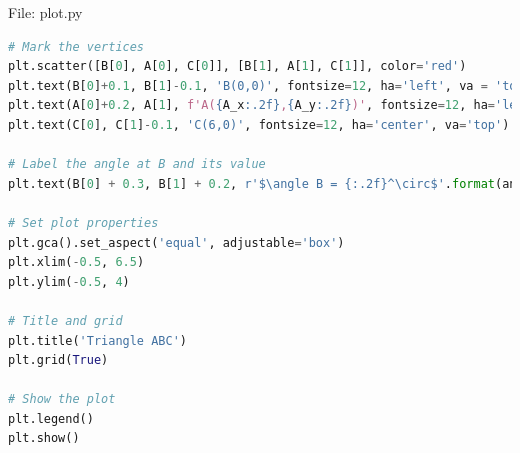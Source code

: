 \documentclass{beamer}
\numberwithin{equation}{section}
\theoremstyle{remark}
\begin{document}
\begin{frame}[fragile]{File: plot.py}
\begin{lstlisting}[language=Python]
# Mark the vertices
plt.scatter([B[0], A[0], C[0]], [B[1], A[1], C[1]], color='red')
plt.text(B[0]+0.1, B[1]-0.1, 'B(0,0)', fontsize=12, ha='left', va = 'top')
plt.text(A[0]+0.2, A[1], f'A({A_x:.2f},{A_y:.2f})', fontsize=12, ha='left', va = 'bottom')
plt.text(C[0], C[1]-0.1, 'C(6,0)', fontsize=12, ha='center', va='top')

# Label the angle at B and its value
plt.text(B[0] + 0.3, B[1] + 0.2, r'$\angle B = {:.2f}^\circ$'.format(angle_B_deg), fontsize=14, ha='left')

# Set plot properties
plt.gca().set_aspect('equal', adjustable='box')
plt.xlim(-0.5, 6.5)
plt.ylim(-0.5, 4)

# Title and grid
plt.title('Triangle ABC')
plt.grid(True)

# Show the plot
plt.legend()
plt.show()

\end{lstlisting}
\end{frame}
\end{document}
